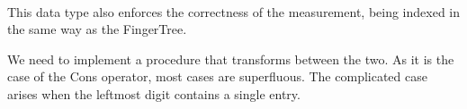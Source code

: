 \documentclass[12pt,twoside,notitlepage]{report}
\begin{document}
\begin{code}
\\
\\
\>  \AgdaSymbol{\{}\AgdaSymbol{\}(} \AgdaSymbol{:}  \AgdaSymbol{)(} \AgdaSymbol{:}  \AgdaSymbol{)}\<%
\\
\>[8]\<[10]%
\>[10]  \AgdaSymbol{:}   \<%
\\
\>[8]\<[10]%
\>[10]  \AgdaSymbol{:}     \AgdaSymbol{:}\<%
\\
\>[8]\<[10]%
\>[10]\AgdaSymbol{\{} \AgdaSymbol{:} \AgdaSymbol{\}}    \<%
\\
\>[0]\<[2]%
\>[2] \AgdaSymbol{:} \<[10]%
\>[10]   \AgdaSymbol{\{}\AgdaSymbol{\}}\<%
\\
\>[0]\<[2]%
\>[2] \AgdaSymbol{:}  \AgdaSymbol{\{}\AgdaSymbol{\}}\<%
\\
\>[2]\<[10]%
\>[10]\AgdaSymbol{(} \AgdaSymbol{:} \AgdaSymbol{)}\<%
\\
\>[2]\<[10]%
\>[10] \AgdaSymbol{(} \AgdaSymbol{:}    \AgdaSymbol{\{}\AgdaSymbol{\})}\<%
\\
\>[2]\<[10]%
\>[10]    \AgdaSymbol{\{}    \AgdaSymbol{\}}\<%
\\
\end{code} 

This data type also enforces the correctness of the measurement, being indexed in the same way as the FingerTree. 

We need to implement a procedure that transforms between the two. As it is the case of the Cons operator, most cases are superfluous. The complicated case arises when the leftmost digit contains a single entry.
\end{document}
